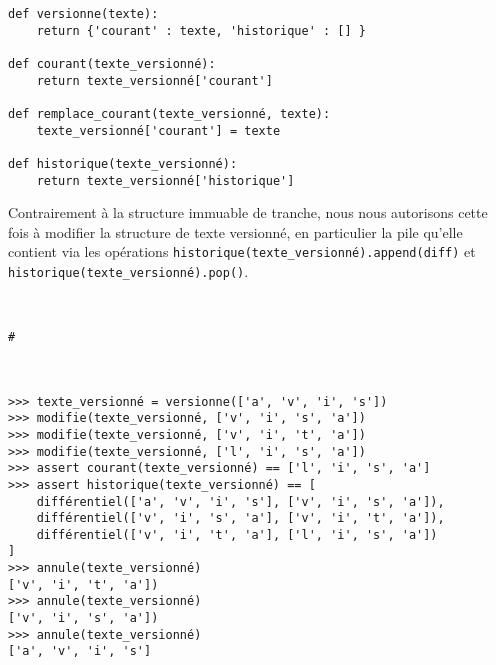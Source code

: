 \begin{lstlisting}
def versionne(texte):
    return {'courant' : texte, 'historique' : [] }

def courant(texte_versionné):
    return texte_versionné['courant']

def remplace_courant(texte_versionné, texte):
    texte_versionné['courant'] = texte

def historique(texte_versionné):
    return texte_versionné['historique']
\end{lstlisting}


Contrairement à la structure immuable de tranche, nous nous autorisons cette fois à modifier la structure de texte versionné, en particulier la pile qu'elle contient via les opérations
\lstinline{historique(texte_versionné).append(diff)} et \lstinline{historique(texte_versionné).pop()}.


\ifprof
\begin{corrige}~\\ 
\vspace{-.5cm}
\begin{lstlisting}
#
\end{lstlisting}
\end{corrige}
\else
\fi


\begin{exemple}~\\ 
\vspace{-.5cm}
\begin{lstlisting}
>>> texte_versionné = versionne(['a', 'v', 'i', 's'])
>>> modifie(texte_versionné, ['v', 'i', 's', 'a'])
>>> modifie(texte_versionné, ['v', 'i', 't', 'a'])
>>> modifie(texte_versionné, ['l', 'i', 's', 'a'])
>>> assert courant(texte_versionné) == ['l', 'i', 's', 'a']
>>> assert historique(texte_versionné) == [
    différentiel(['a', 'v', 'i', 's'], ['v', 'i', 's', 'a']),
    différentiel(['v', 'i', 's', 'a'], ['v', 'i', 't', 'a']),
    différentiel(['v', 'i', 't', 'a'], ['l', 'i', 's', 'a'])
]
>>> annule(texte_versionné)
['v', 'i', 't', 'a'])
>>> annule(texte_versionné)
['v', 'i', 's', 'a'])
>>> annule(texte_versionné)
['a', 'v', 'i', 's']
\end{lstlisting}
\end{exemple}

